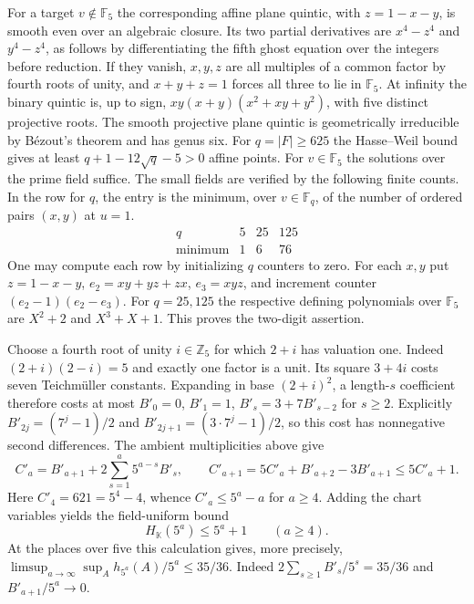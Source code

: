 \documentclass[11pt,letterpaper]{article}
\theoremstyle{definition}
\numberwithin{equation}{section}
\begin{document}
For a target $v\notin\mathbb F_5$ the corresponding affine plane
quintic, with $z=1-x-y$, is smooth even over an algebraic closure.
Its two partial derivatives are $x^4-z^4$ and $y^4-z^4$, as follows
by differentiating the fifth ghost equation over the integers before
reduction. If they vanish, $x,y,z$ are all multiples of a common
factor by fourth roots of unity, and $x+y+z=1$ forces all three
to lie in $\mathbb F_5$. At infinity the binary quintic is, up to sign,
$xy(x+y)(x^2+xy+y^2)$, with five distinct projective roots.
The smooth projective plane quintic is geometrically irreducible by
B\'ezout's theorem and has genus six. For $q=|F|\ge625$ the
Hasse--Weil bound gives at least $q+1-12\sqrt q-5>0$ affine points.
For $v\in\mathbb F_5$ the solutions over the prime field suffice.
The small fields are verified by the following finite counts.
In the row for $q$, the entry is the minimum, over $v\in\mathbb F_q$,
of the number of ordered pairs $(x,y)$ at $u=1$.
\[
\begin{array}{c|ccc}q&5&25&125\\\hline \text{minimum}&1&6&76\end{array}
\]
One may compute each row by initializing $q$ counters to zero.
For each $x,y$ put $z=1-x-y$, $e_2=xy+yz+zx$, $e_3=xyz$,
and increment counter $(e_2-1)(e_2-e_3)$. For $q=25,125$ the
respective defining polynomials over $\mathbb F_5$ are $X^2+2$ and
$X^3+X+1$. This proves the two-digit assertion.

Choose a fourth root of unity $i\in\mathbb Z_5$ for which $2+i$
has valuation one. Indeed $(2+i)(2-i)=5$ and exactly one factor
is a unit. Its square $3+4i$ costs seven Teichm\"uller constants.
Expanding in base $(2+i)^2$, a length-$s$ coefficient therefore
costs at most $B'_0=0$, $B'_1=1$, $B'_s=3+7B'_{s-2}$ for $s\ge2$.
Explicitly $B'_{2j}=(7^j-1)/2$ and $B'_{2j+1}=(3\cdot7^j-1)/2$,
so this cost has nonnegative second differences. The ambient
multiplicities above give
\[
             C'_a=B'_{a+1}+2\sum_{s=1}^a 5^{a-s}B'_s,
             \qquad C'_{a+1}=5C'_a+B'_{a+2}-3B'_{a+1}
                            \le5C'_a+1.
\]
Here $C'_4=621=5^4-4$, whence $C'_a\le5^a-a$ for $a\ge4$.
Adding the chart variables yields the field-uniform bound
\begin{equation}\label{eq:hteich-five}
                         H_{\mathbb K}(5^a)\le 5^a+1
                             \qquad(a\ge4).
\end{equation}
At the places over five this calculation gives, more precisely,
$\limsup_{a\to\infty}\sup_A h_{5^a}(A)/5^a\le35/36$.
Indeed $2\sum_{s\ge1}B'_s/5^s=35/36$ and
$B'_{a+1}/5^a\to0$.
\end{document}
